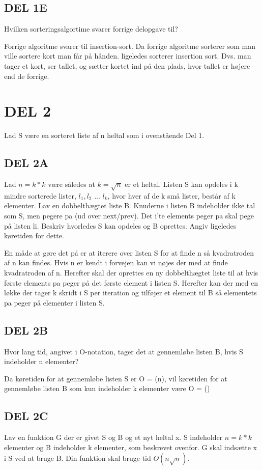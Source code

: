 \documentclass[a4paper]{article}
\begin{document}
\subsection{DEL 1E}
Hvilken sorteringsalgortime svarer forrige delopgave til?

\bigskip\noindent
Forrige algoritme svarer til insertion-sort. Da forrige algoritme
sorterer som man ville sortere kort man får på hånden. ligeledes
sorterer insertion sort. Dvs. man tager et kort, ser tallet, og
sætter kortet ind på den plads, hvor tallet er højere end de forrige.

\section{DEL 2}
Lad S være en sorteret liste af n heltal som i ovenstående Del 1.

\subsection{DEL 2A}
Lad $n = k * k$ være således at $k = \sqrt{n}$ er et heltal. Listen S kan opdeles i k mindre sorterede lister, $l_1, l_2$ ... $l_k$, hvor hver af de k små lister, består af k elementer. Lav en dobbelthægtet liste B. Knuderne i listen B indeholder ikke tal som S, men pegere pa (ud over next/prev). Det i’te elements peger pa skal pege på listen li. Beskriv hvorledes S kan opdeles og B oprettes. Angiv ligeledes køretiden for dette.

En måde at gøre det på er at iterere over listen S for at finde n så kvadratroden af n kan findes. Hvis n er kendt i forvejen kan vi nøjes der med at finde kvadratroden af n. Herefter skal  der oprettes en ny dobbelthægtet liste til at hvis første elements pa peger på det første element i listen S. Herefter kan der med en løkke der tager k skridt i S per iteration og tilføjer et element til B så elementets pa peger på elementer i listen S. 


\subsection{DEL 2B}
Hvor lang tid, angivet i O-notation, tager det at gennemløbe listen B, hvis S indeholder n elementer?

Da køretiden for at gennemløbe listen S er O = (n), vil køretiden for at gennemløbe listen B som kun indeholder k elementer være O = ()


\subsection{DEL 2C}
Lav en funktion G der er givet S og B og et nyt heltal x. S indeholder $n = k * k$ elementer og B indeholder k elementer, som beskrevet ovenfor. G skal indsætte x i S ved at bruge B. Din funktion skal bruge tid $O(n\sqrt{n})$.
\end{document}
